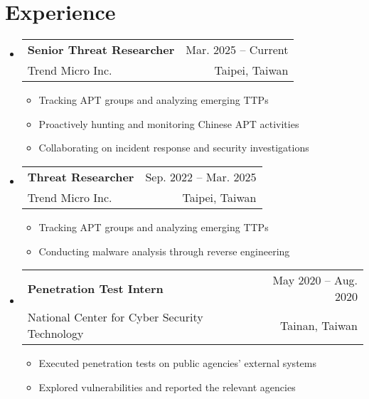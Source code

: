 \documentclass[A4,11pt]{article}
\makeatletter
\newcommand{\CVItem}[1]{
  \item\small{
    {#1 \vspace{-2pt}}
  }
}
\newcommand{\CVSubheading}[4]{
  \vspace{-2pt}\item
    \begin{tabular*}{0.97\textwidth}[t]{l@{\extracolsep{\fill}}r}
      \textbf{#1} & #2 \\
      \small#3 & \small #4 \\
    \end{tabular*}\vspace{-7pt}
}
\newcommand{\CVSubHeadingListStart}{\begin{itemize}[leftmargin=0.5cm, label={}]}
\newcommand{\CVSubHeadingListEnd}{\end{itemize}}
\newcommand{\CVItemListStart}{\begin{itemize}}
\newcommand{\CVItemListEnd}{\end{itemize}\vspace{-5pt}}
\makeatother
\begin{document}
\begin{comment}
This CV was written for specifically for positions I was applying for in
academia, and then modified to be a template.

A standard CV is about two pages long where as a resume in the US is one page.
sections can be added and removed here with this in mind. In my experience, 
education, and applicable work experience and skills are the most import things
to include on a resume. For a CV the Europass CV suggests the categories: Work
Experience, Education and Training, Language Skills, Digital Skills,
Communication and Interpersonal Skills, Conferences and Seminars, Creative Works
Driver's License, Hobbies and Interests, Honors and Awards, Management and
Leadership Skills, Networks and Memberships, Organizational Skills, Projects,
Publications, Recommendations, Social and Political Activities, Volunteering.

Your goal is to convey a who, what , when, where, why for every item you share. 
The who is obviously you, but I believe the rest should be done in that order.
For example below. An employer cares most about the degree held and typically 
less about the institution or where it is located (This is still good 
information though). Whatever order you choose be consistent throughout.
\end{comment}

\begin{comment}
  try to briefly explain what you did and why it is relevant to the position you
  are seeking
  \end{comment}
  
  \section{Experience}
    \CVSubHeadingListStart
      \CVSubheading
        {Senior Threat Researcher}{Mar. 2025 -- Current}
        {Trend Micro Inc.}{Taipei, Taiwan}
        \CVItemListStart
          \CVItem{Tracking APT groups and analyzing emerging TTPs}
          \CVItem{Proactively hunting and monitoring Chinese APT activities}
          \CVItem{Collaborating on incident response and security investigations}
        \CVItemListEnd
      \CVSubheading
        {Threat Researcher}{Sep. 2022 -- Mar. 2025}
        {Trend Micro Inc.}{Taipei, Taiwan}
        \CVItemListStart
          \CVItem{Tracking APT groups and analyzing emerging TTPs}
          \CVItem{Conducting malware analysis through reverse engineering}
        \CVItemListEnd
      \CVSubheading
        {Penetration Test Intern}{May 2020 -- Aug. 2020}
        {National Center for Cyber Security Technology}{Tainan, Taiwan}
        \CVItemListStart
          \CVItem{Executed penetration tests on public agencies' external systems}
          \CVItem{Explored vulnerabilities and reported the relevant agencies}
        \CVItemListEnd
    \CVSubHeadingListEnd
\end{document}
